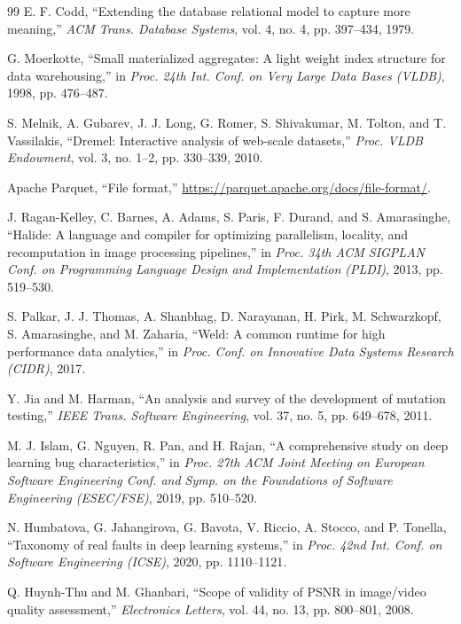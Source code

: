 \begin{thebibliography}{99}
E. F. Codd, ``Extending the database relational model to capture more meaning,'' \emph{ACM Trans.
Database Systems}, vol. 4, no. 4, pp. 397--434, 1979.

G. Moerkotte, ``Small materialized aggregates: A light weight index structure for data
warehousing,'' in \emph{Proc. 24th Int. Conf. on Very Large Data Bases (VLDB)}, 1998, pp. 476--487.

S. Melnik, A. Gubarev, J. J. Long, G. Romer, S. Shivakumar, M. Tolton, and T. Vassilakis, ``Dremel:
Interactive analysis of web-scale datasets,'' \emph{Proc. VLDB Endowment}, vol. 3, no. 1--2,
pp. 330--339, 2010.

Apache Parquet, ``File format,'' \url{https://parquet.apache.org/docs/file-format/}.

J. Ragan-Kelley, C. Barnes, A. Adams, S. Paris, F. Durand, and S. Amarasinghe, ``Halide: A language
and compiler for optimizing parallelism, locality, and recomputation in image processing
pipelines,'' in \emph{Proc. 34th ACM SIGPLAN Conf. on Programming Language Design and
Implementation (PLDI)}, 2013, pp. 519--530.

S. Palkar, J. J. Thomas, A. Shanbhag, D. Narayanan, H. Pirk, M. Schwarzkopf, S. Amarasinghe, and
M. Zaharia, ``Weld: A common runtime for high performance data analytics,'' in \emph{Proc. Conf. on
Innovative Data Systems Research (CIDR)}, 2017.

Y. Jia and M. Harman, ``An analysis and survey of the development of mutation testing,'' \emph{IEEE
Trans. Software Engineering}, vol. 37, no. 5, pp. 649--678, 2011.

M. J. Islam, G. Nguyen, R. Pan, and H. Rajan, ``A comprehensive study on deep learning bug
characteristics,'' in \emph{Proc. 27th ACM Joint Meeting on European Software Engineering Conf. and
Symp. on the Foundations of Software Engineering (ESEC/FSE)}, 2019, pp. 510--520.

N. Humbatova, G. Jahangirova, G. Bavota, V. Riccio, A. Stocco, and P. Tonella, ``Taxonomy of real
faults in deep learning systems,'' in \emph{Proc. 42nd Int. Conf. on Software Engineering (ICSE)},
2020, pp. 1110--1121.

Q. Huynh-Thu and M. Ghanbari, ``Scope of validity of PSNR in image/video quality assessment,''
\emph{Electronics Letters}, vol. 44, no. 13, pp. 800--801, 2008.


\end{thebibliography}
